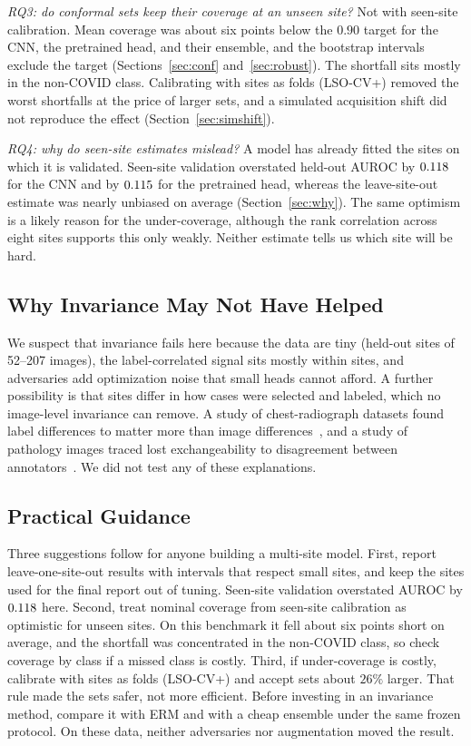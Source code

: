 \documentclass[journal]{IEEEtran}
\newcommand{\erm}{ERM}
\begin{document}
\emph{RQ3: do conformal sets keep their coverage at an unseen site?} Not with seen-site calibration. Mean coverage was about six points below the $0.90$ target for the CNN, the pretrained head, and their ensemble, and the bootstrap intervals exclude the target (Sections~\ref{sec:conf} and~\ref{sec:robust}). The shortfall sits mostly in the non-COVID class. Calibrating with sites as folds (LSO-CV+) removed the worst shortfalls at the price of larger sets, and a simulated acquisition shift did not reproduce the effect (Section~\ref{sec:simshift}).

\emph{RQ4: why do seen-site estimates mislead?} A model has already fitted the sites on which it is validated. Seen-site validation overstated held-out AUROC by $0.118$ for the CNN and by $0.115$ for the pretrained head, whereas the leave-site-out estimate was nearly unbiased on average (Section~\ref{sec:why}). The same optimism is a likely reason for the under-coverage, although the rank correlation across eight sites supports this only weakly. Neither estimate tells us which site will be hard.

\subsection{Why Invariance May Not Have Helped}
We suspect that invariance fails here because the data are tiny (held-out sites of 52--207 images), the label-correlated signal sits mostly within sites, and adversaries add optimization noise that small heads cannot afford. A further possibility is that sites differ in how cases were selected and labeled, which no image-level invariance can remove. A study of chest-radiograph datasets found label differences to matter more than image differences~\cite{cohen2020limits}, and a study of pathology images traced lost exchangeability to disagreement between annotators~\cite{boman2026conformal}. We did not test any of these explanations.

\subsection{Practical Guidance}
Three suggestions follow for anyone building a multi-site model. First, report leave-one-site-out results with intervals that respect small sites, and keep the sites used for the final report out of tuning. Seen-site validation overstated AUROC by $0.118$ here. Second, treat nominal coverage from seen-site calibration as optimistic for unseen sites. On this benchmark it fell about six points short on average, and the shortfall was concentrated in the non-COVID class, so check coverage by class if a missed class is costly. Third, if under-coverage is costly, calibrate with sites as folds (LSO-CV+) and accept sets about $26\%$ larger. That rule made the sets safer, not more efficient. Before investing in an invariance method, compare it with \erm{} and with a cheap ensemble under the same frozen protocol. On these data, neither adversaries nor augmentation moved the result.
\end{document}
